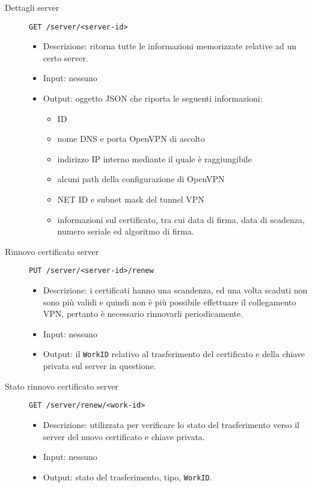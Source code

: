 \begin{description}
    \item[Dettagli server]\texttt{GET /server/<server-id>}
    \begin{itemize}
        \item Descrizione: ritorna tutte le informazioni memorizzate relative ad un certo
        server.
        \item Input: nessuno
        \item Output: oggetto JSON che riporta le seguenti informazioni:
        \begin{itemize}
            \item ID
            \item nome DNS e porta OpenVPN di ascolto
            \item indirizzo IP interno mediante il quale è raggiungibile
            \item alcuni path della configurazione di OpenVPN
            \item NET ID e subnet mask del tunnel VPN
            \item informazioni sul certificato, tra cui data di firma, data di scadenza,
            numero seriale ed algoritmo di firma.
        \end{itemize}
    \end{itemize}

    \item[Rinnovo certificato server]\texttt{PUT /server/<server-id>/renew}
    \begin{itemize}
        \item Descrizione: i certificati hanno una scandenza, ed una volta scaduti
        non sono più validi e quindi non è più possibile effettuare il collegamento VPN,
        pertanto è necessario rinnovarli periodicamente.
        \item Input: nessuno
        \item Output: il \texttt{WorkID} relativo al trasferimento del certificato e
        della chiave privata sul server in questione.
    \end{itemize}

    \item[Stato rinnovo certificato server]\texttt{GET /server/renew/<work-id>}
    \begin{itemize}
        \item Descrizione: utilizzata per verificare lo stato del trasferimento verso
        il server del nuovo certificato e chiave privata.
        \item Input: nessuno
        \item Output: stato del trasferimento, tipo, \texttt{WorkID}.
    \end{itemize}


\end{description}
